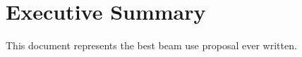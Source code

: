 \chapter*{Executive Summary}
\label{executive_summary}
\setcounter{page}{1}

This document represents the best beam use proposal ever written.


